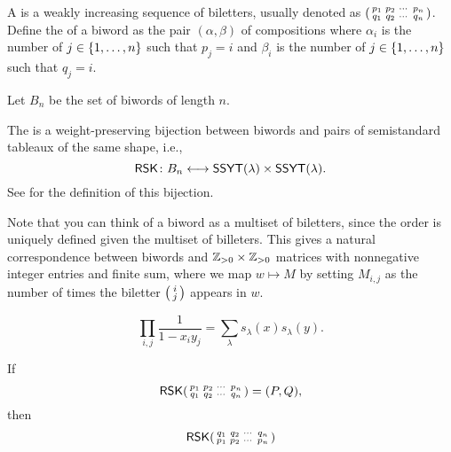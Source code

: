 A  is a weakly increasing sequence of biletters,
usually denoted as \(\begin{psmallmatrix} p_1 & p_2 & \cdots & p_n \\ q_1 & q_2 & \cdots & q_n \end{psmallmatrix} \).
Define the  of a biword as the pair \((\alpha, \beta)\) of compositions where \(\alpha_i\) is the number of \(j \in \interval{n}\) such that \(p_j = i\) and \(\beta_i\) is the number of \(j \in \interval{n}\) such that \(q_j = i\).

Let \(B_n\) be the set of biwords of length \(n\).

The  is a weight-preserving bijection between biwords and pairs of semistandard tableaux of the same shape, i.e.,
\begin{equation}
    \operatorname{\mathsf{RSK}} \colon B_n \longleftrightarrow \operatorname{\mathsf{SSYT}}(\lambda) \times \operatorname{\mathsf{SSYT}}(\lambda).
\end{equation}
See \cite{Fulton1997} for the definition of this bijection.

Note that you can think of a biword as a multiset of biletters, since the order is uniquely defined given the multiset of billeters.
This gives a natural correspondence between biwords and \(\mathbb{Z}_{> 0} \times \mathbb{Z}_{> 0}\) matrices with nonnegative integer entries and finite sum,
where we map \(w \mapsto M\) by setting \(M_{i, j}\) as the number of times the biletter \(\begin{psmallmatrix} i \\ j \end{psmallmatrix}\) appears in \(w\).

\begin{corollary}
    \begin{equation}
        \prod_{i, j} \frac{1}{1 - x_i y_j} = \sum_{\lambda} s_\lambda(x) s_\lambda(y).
    \end{equation}
\end{corollary}

\begin{corollary}
    If
    \begin{equation}
        \operatorname{\mathsf{RSK}} \begin{psmallmatrix} p_1 & p_2 & \cdots & p_n \\ q_1 & q_2 & \cdots & q_n \end{psmallmatrix}
        = (P, Q),
    \end{equation}
    then
    \begin{equation}
        \operatorname{\mathsf{RSK}} \begin{psmallmatrix} q_1 & q_2 & \cdots & q_n \\ p_1 & p_2 & \cdots & p_n \end{psmallmatrix}
    \end{equation}
\end{corollary}

